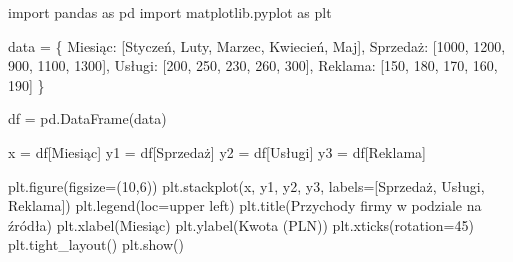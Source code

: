 \documentclass[
  polish,
  letterpaper,
  DIV=11,
  numbers=noendperiod]{scrreprt}
\newenvironment{Shaded}{\begin{snugshade}}{\end{snugshade}}
\newcommand{\DecValTok}[1]{\textcolor[rgb]{0.68,0.00,0.00}{#1}}
\newcommand{\ImportTok}[1]{\textcolor[rgb]{0.00,0.46,0.62}{#1}}
\newcommand{\NormalTok}[1]{\textcolor[rgb]{0.00,0.23,0.31}{#1}}
\newcommand{\OperatorTok}[1]{\textcolor[rgb]{0.37,0.37,0.37}{#1}}
\newcommand{\StringTok}[1]{\textcolor[rgb]{0.13,0.47,0.30}{#1}}
\begin{document}
\begin{Shaded}
\begin{Highlighting}[]
\ImportTok{import}\NormalTok{ pandas }\ImportTok{as}\NormalTok{ pd}
\ImportTok{import}\NormalTok{ matplotlib.pyplot }\ImportTok{as}\NormalTok{ plt}

\NormalTok{data }\OperatorTok{=}\NormalTok{ \{}
    \StringTok{\textquotesingle{}Miesiąc\textquotesingle{}}\NormalTok{: [}\StringTok{\textquotesingle{}Styczeń\textquotesingle{}}\NormalTok{, }\StringTok{\textquotesingle{}Luty\textquotesingle{}}\NormalTok{, }\StringTok{\textquotesingle{}Marzec\textquotesingle{}}\NormalTok{, }\StringTok{\textquotesingle{}Kwiecień\textquotesingle{}}\NormalTok{, }\StringTok{\textquotesingle{}Maj\textquotesingle{}}\NormalTok{],}
    \StringTok{\textquotesingle{}Sprzedaż\textquotesingle{}}\NormalTok{: [}\DecValTok{1000}\NormalTok{, }\DecValTok{1200}\NormalTok{, }\DecValTok{900}\NormalTok{, }\DecValTok{1100}\NormalTok{, }\DecValTok{1300}\NormalTok{],}
    \StringTok{\textquotesingle{}Usługi\textquotesingle{}}\NormalTok{: [}\DecValTok{200}\NormalTok{, }\DecValTok{250}\NormalTok{, }\DecValTok{230}\NormalTok{, }\DecValTok{260}\NormalTok{, }\DecValTok{300}\NormalTok{],}
    \StringTok{\textquotesingle{}Reklama\textquotesingle{}}\NormalTok{: [}\DecValTok{150}\NormalTok{, }\DecValTok{180}\NormalTok{, }\DecValTok{170}\NormalTok{, }\DecValTok{160}\NormalTok{, }\DecValTok{190}\NormalTok{]}
\NormalTok{\}}

\NormalTok{df }\OperatorTok{=}\NormalTok{ pd.DataFrame(data)}

\NormalTok{x }\OperatorTok{=}\NormalTok{ df[}\StringTok{\textquotesingle{}Miesiąc\textquotesingle{}}\NormalTok{]}
\NormalTok{y1 }\OperatorTok{=}\NormalTok{ df[}\StringTok{\textquotesingle{}Sprzedaż\textquotesingle{}}\NormalTok{]}
\NormalTok{y2 }\OperatorTok{=}\NormalTok{ df[}\StringTok{\textquotesingle{}Usługi\textquotesingle{}}\NormalTok{]}
\NormalTok{y3 }\OperatorTok{=}\NormalTok{ df[}\StringTok{\textquotesingle{}Reklama\textquotesingle{}}\NormalTok{]}

\NormalTok{plt.figure(figsize}\OperatorTok{=}\NormalTok{(}\DecValTok{10}\NormalTok{,}\DecValTok{6}\NormalTok{))}
\NormalTok{plt.stackplot(x, y1, y2, y3, labels}\OperatorTok{=}\NormalTok{[}\StringTok{\textquotesingle{}Sprzedaż\textquotesingle{}}\NormalTok{, }\StringTok{\textquotesingle{}Usługi\textquotesingle{}}\NormalTok{, }\StringTok{\textquotesingle{}Reklama\textquotesingle{}}\NormalTok{])}
\NormalTok{plt.legend(loc}\OperatorTok{=}\StringTok{\textquotesingle{}upper left\textquotesingle{}}\NormalTok{)}
\NormalTok{plt.title(}\StringTok{\textquotesingle{}Przychody firmy w podziale na źródła\textquotesingle{}}\NormalTok{)}
\NormalTok{plt.xlabel(}\StringTok{\textquotesingle{}Miesiąc\textquotesingle{}}\NormalTok{)}
\NormalTok{plt.ylabel(}\StringTok{\textquotesingle{}Kwota (PLN)\textquotesingle{}}\NormalTok{)}
\NormalTok{plt.xticks(rotation}\OperatorTok{=}\DecValTok{45}\NormalTok{)}
\NormalTok{plt.tight\_layout()}
\NormalTok{plt.show()}
\end{Highlighting}
\end{Shaded}
\end{document}
